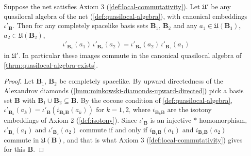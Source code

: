 \begin{lemma}
    \label{lmm:local-commutativity-any-quasilocal}
    \leanok
    Suppose the net satisfies Axiom 3 (\ref{def:local-commutativity}). Let $\mathfrak{U}'$ be any quasilocal algebra of the net (\ref{def:quasilocal-algebra}), with canonical embeddings $\iota'_{\mathbf{B}}$. Then for any completely spacelike basis sets $\mathbf{B}_1$, $\mathbf{B}_2$ and any $a_1 \in \mathfrak{U}(\mathbf{B}_1)$, $a_2 \in \mathfrak{U}(\mathbf{B}_2)$,
    \begin{align}
        \iota'_{\mathbf{B}_1}(a_1)\, \iota'_{\mathbf{B}_2}(a_2) = \iota'_{\mathbf{B}_2}(a_2)\, \iota'_{\mathbf{B}_1}(a_1)
    \end{align}
    in $\mathfrak{U}'$. In particular these images commute in the canonical quasilocal algebra of \ref{thrm:quasilocal-algebra-exists}.
\end{lemma}
\begin{proof}
    \leanok
    Let $\mathbf{B}_1$, $\mathbf{B}_2$ be completely spacelike. By upward directedness of the Alexandrov diamonds (\ref{lmm:minkowski-diamonds-upward-directed}) pick a basis set $\mathbf{B}$ with $\mathbf{B}_1 \cup \mathbf{B}_2 \subseteq \mathbf{B}$. By the cocone condition of \ref{def:quasilocal-algebra}, $\iota'_{\mathbf{B}_k}(a_k) = \iota'_{\mathbf{B}}(i_{\mathbf{B}_k\mathbf{B}}(a_k))$ for $k = 1, 2$, where $i_{\mathbf{B}_k\mathbf{B}}$ are the isotony embeddings of Axiom 2 (\ref{def:isotony}). Since $\iota'_{\mathbf{B}}$ is an injective $*$-homomorphism, $\iota'_{\mathbf{B}_1}(a_1)$ and $\iota'_{\mathbf{B}_2}(a_2)$ commute if and only if $i_{\mathbf{B}_1\mathbf{B}}(a_1)$ and $i_{\mathbf{B}_2\mathbf{B}}(a_2)$ commute in $\mathfrak{U}(\mathbf{B})$, and that is what Axiom 3 (\ref{def:local-commutativity}) gives for this $\mathbf{B}$.
\end{proof}

